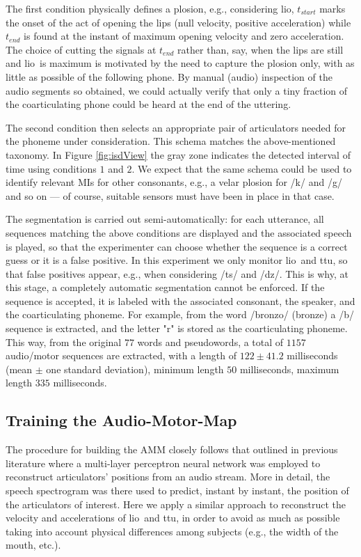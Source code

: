 \documentclass[10pt]{article}
\newcommand{\lio}{\textsf{lio}}
\newcommand{\ttu}{\textsf{ttu}}
\begin{document}
The first condition physically defines a plosion, e.g., considering \lio, $t_{start}$
marks the onset of the act of opening the lips (null velocity, positive acceleration)
while $t_{end}$ is found at the instant of maximum opening velocity and zero acceleration.
The choice of cutting the signals at $t_{end}$ rather than, say, when the lips are still
and \lio\ is maximum is motivated by the need to capture the plosion only, with as little
as possible of the following phone. By manual (audio) inspection of the audio segments so
obtained, we could actually verify that only a tiny fraction of the coarticulating phone
could be heard at the end of the uttering.

The second condition then selects an appropriate pair of articulators needed for the
phoneme under consideration. This schema matches the above-mentioned taxonomy. In Figure
\ref{fig:isdView} the gray zone indicates the detected interval of time using conditions
$1$ and $2$. We expect that the same schema could be used to identify relevant MIs for
other consonants, e.g., a velar plosion for /k/ and /g/ and so on --- of course, suitable
sensors must have been in place in that case.

The segmentation is carried out semi-automatically: for each
utterance, all sequences matching the above conditions are displayed and the
associated speech is played, so that the experimenter can choose whether the
sequence is a correct guess or it is a false positive. In this experiment we only
monitor \lio\ and \ttu, so that false positives appear, e.g., when considering
/ts/ and /dz/. This is why, at this stage, a completely automatic segmentation
cannot be enforced. If the sequence is accepted, it is labeled
with the associated consonant, the speaker, and the
coarticulating phoneme. For example, from the word /bronzo/ (bronze) a /b/
sequence is extracted, and the letter "r" is stored as the coarticulating phoneme.
This way, from the original $77$ words and pseudowords, a total
of $1157$ audio/motor sequences are extracted, with a length of $122 \pm 41.2$
milliseconds (mean $\pm$ one standard deviation), minimum length $50$ milliseconds,
maximum length $335$ milliseconds.


\subsection*{Training the Audio-Motor-Map}
\label{subsec:amm_setup}

The procedure for building the AMM closely follows that outlined in previous
literature \cite{papcun,richmond,richmond2007} where a multi-layer perceptron
neural network was employed to reconstruct articulators' positions from an
audio stream. More in detail, the speech spectrogram was there used to predict,
instant by instant, the position of the articulators of interest. Here we apply
a similar approach to reconstruct the velocity and accelerations of \lio\ and \ttu,
in order to avoid as much as possible taking into account physical differences
among subjects (e.g., the width of the mouth, etc.).
\end{document}
